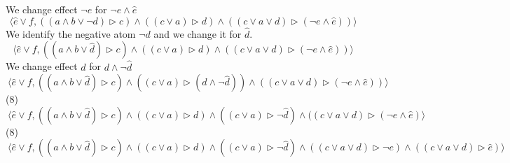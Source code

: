 \documentclass[12pt,a4paper]{article}
\begin{document}
	We change effect $\neg e$ for $\neg{e} \land \hat{e}$
	\[\ \langle \hat{e} \lor f, ((a \land b \lor \neg d) \triangleright c) \land ((c \lor a) \triangleright d) \land ((c \lor a \lor d) \triangleright (\neg{e} \land \hat{e})) \rangle \]
	We identify the negative atom $\neg d$ and we change it for $\hat{d}$.
	\[\ \langle \hat{e} \lor f, ((a \land b \lor \hat{d}) \triangleright c) \land ((c \lor a) \triangleright d) \land ((c \lor a \lor d) \triangleright (\neg{e} \land \hat{e})) \rangle \]
	We change effect $d$ for $d \land \neg \hat{d}$
	\[\ \langle \hat{e} \lor f, ((a \land b \lor \hat{d}) \triangleright c) \land ((c \lor a) \triangleright (d \land \neg \hat{d})) \land ((c \lor a \lor d) \triangleright (\neg{e} \land \hat{e})) \rangle \]
	(8)
	\[\ \langle \hat{e} \lor f, ((a \land b \lor \hat{d}) \triangleright c) \land ((c \lor a) \triangleright d) \land ((c \lor a) \triangleright \neg\hat{d}) \land ((c \lor a \lor d) \triangleright (\neg{e} \land \hat{e}) \rangle \]
	(8)
	\[\ \langle \hat{e} \lor f, ((a \land b \lor \hat{d}) \triangleright c) \land ((c \lor a) \triangleright d) \land ((c \lor a) \triangleright \neg\hat{d}) \land ((c \lor a \lor d) \triangleright \neg{e}) \land ((c \lor a \lor d) \triangleright \hat{e}) \rangle \]
\end{document}
